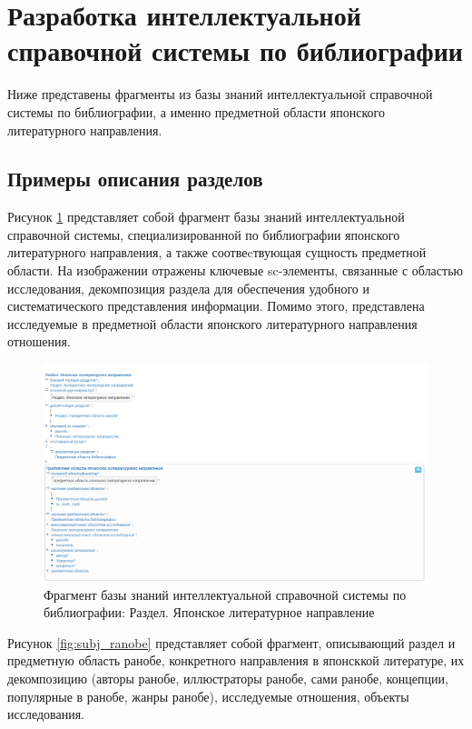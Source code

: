 \section{Разработка интеллектуальной справочной системы по библиографии}
\label{sec:development}

Ниже представены фрагменты из базы знаний интеллектуальной справочной системы по библиографии, а именно предметной области японского литературного направления.

\subsection{Примеры описания разделов}

Рисунок \ref{fig:fragment_japanese_literature} представляет собой фрагмент базы знаний интеллектуальной справочной системы, специализированной по библиографии японского литературного направления, а также соотвеcтвующая сущность предметной области. На изображении отражены ключевые sc-элементы, связанные с областью исследования, декомпозиция раздела для обеспечения удобного и систематического представления информации. Помимо этого, представлена исследуемые в предметной области японского литературного направления отношения.

\begin{figure}[H]
    \centering
    \includegraphics[scale=0.41]{imgs/japanese_literature.png}
    \caption{Фрагмент базы знаний интеллектуальной справочной системы по библиографии: Раздел. Японское литературное направление}
    \label{fig:fragment_japanese_literature}
\end{figure}

Рисунок \ref{fig:subj_ranobe} представляет собой фрагмент, описывающий раздел и предметную область ранобе, конкретного направления в японсккой литературе, их декомпозицию (авторы ранобе, иллюстраторы ранобе, сами ранобе, концепции, популярные в ранобе, жанры ранобе), исследуемые отношения, объекты исследования.

